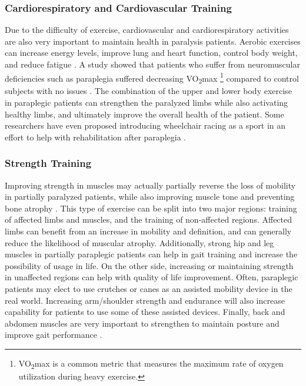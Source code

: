 \subsubsection{Cardiorespiratory and Cardiovascular Training}
Due to the difficulty of exercise, cardiovascular and cardiorespiratory activities are also very important to maintain health in paralysis patients. Aerobic exercises can increase energy levels, improve lung and heart function, control body weight, and reduce fatigue \cite{RehabParaplegia} \cite{AerobicCapacityParaplegia}. A study showed that patients who suffer from neuromuscular deficiencies such as paraplegia suffered decreasing VO\textsubscript{2}max \footnote{VO\textsubscript{2}max is a common metric that measures the maximum rate of oxygen utilization during heavy exercise.} compared to control subjects with no issues \cite{AerobicCapacityParaplegia}. The combination of the upper and lower body exercise in paraplegic patients can strengthen the paralyzed limbs while also activating healthy limbs, and ultimately improve the overall health of the patient. Some researchers have even proposed introducing wheelchair racing as a sport in an effort to help with rehabilitation after paraplegia \cite{WheelchairRacingParaplegia}.

\subsubsection{Strength Training}
Improving strength in muscles may actually partially reverse the loss of mobility in partially paralyzed patients, while also improving muscle tone \cite{AerobicCapacityParaplegia} and preventing bone atrophy \cite{ParalysisStretchingWeightLoadingPMID}. This type of exercise can be split into two major regions: training of affected limbs and muscles, and the training of non-affected regions. Affected limbs can benefit from an increase in mobility and definition, and can generally reduce the likelihood of muscular atrophy. Additionally, strong hip and leg muscles in partially paraplegic patients can help in gait training and increase the possibility of usage in life. On the other side, increasing or maintaining strength in unaffected regions can help with quality of life improvement. Often, paraplegic patients may elect to use crutches or canes as an assisted mobility device in the real world. Increasing arm/shoulder strength and endurance will also increase capability for patients to use some of these assisted devices. Finally, back and abdomen muscles are very important to strengthen to maintain posture and improve gait performance \cite{TrunkMuscleLoadingParaplegia}. 

